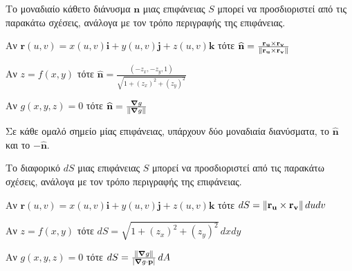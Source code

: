 \begin{dfn}
  Το μοναδιαίο κάθετο διάνυσμα $ \mathbf{n} $ μιας επιφάνειας $ S $ μπορεί να 
  προσδιοριστεί από τις παρακάτω σχέσεις, ανάλογα με τον τρόπο περιγραφής της επιφάνειας.
  \begin{myitemize}
    \item Αν $ \mathbf{r}(u,v) = x(u,v)\mathbf{i}+y(u,v)\mathbf{j}+z(u,v)\mathbf{k} $ 
      τότε $ \mathbf{\widehat{n}} = \frac{\mathbf{r_{u}} \times
      \mathbf{r_{v}}}{\norm{\mathbf{r_{u}} \times \mathbf{r_{v}}}} $ 
    \item Αν $ z=f(x,y) $ τότε $ \mathbf{\widehat{n}} =
      \frac{(-z_{x},-z_{y},1)}{\sqrt{1+(z_{x})^{2}+(z_{y})^{2}}} $ 
    \item Αν $ g(x,y,z)=0 $ τότε $ \mathbf{\widehat{n}} = \frac{\grad g}{\norm{\grad g}} $
  \end{myitemize}
\end{dfn}

\begin{rem}
  Σε κάθε ομαλό σημείο μίας επιφάνειας, υπάρχουν δύο μοναδιαία διανύσματα, το $
  \mathbf{\widehat{n}} $ και το $ -\mathbf{\widehat{n}} $.  
\end{rem}

\begin{dfn}
  Το διαφορικό $ dS $ μιας επιφάνειας $S$ μπορεί να προσδιοριστεί από τις παρακάτω 
  σχέσεις, ανάλογα με τον τρόπο περιγραφής της επιφάνειας.
  \begin{myitemize}
    \item Αν $ \mathbf{r}(u,v) = x(u,v)\mathbf{i}+y(u,v)\mathbf{j}+z(u,v)\mathbf{k} $ 
      τότε $ dS = \norm{\mathbf{r_{u}} \times \mathbf{r_{v}}} \, du dv $ 
    \item Αν $ z=f(x,y) $ τότε $dS = \sqrt{1+(z_{x})^{2}+(z_{y})^{2}} \,dxdy $ 
    \item Αν $ g(x,y,z)=0 $ τότε $dS = \frac{\norm{\grad g}}{\abs{\grad g \cdot 
      \mathbf{p}}}\, dA $
  \end{myitemize}
\end{dfn}




